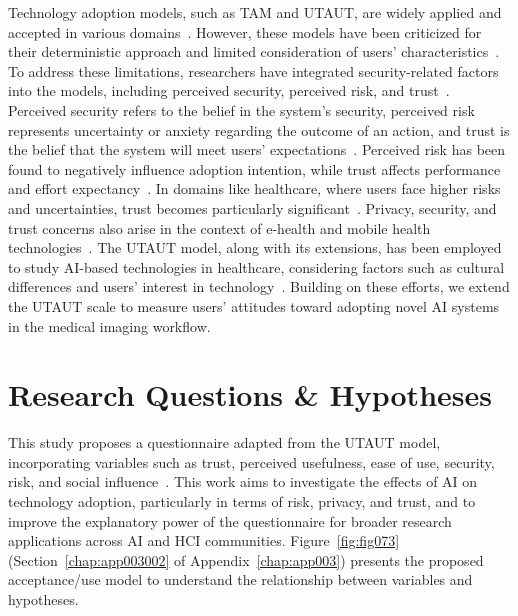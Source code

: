 Technology adoption models, such as \ac{TAM} and \ac{UTAUT}, are widely applied and accepted in various domains~\cite{venkatesh2016unified}.
However, these models have been criticized for their deterministic approach and limited consideration of users' characteristics~\cite{https://doi.org/10.1002/mar.20823}.
To address these limitations, researchers have integrated security-related factors into the models, including perceived security, perceived risk, and trust~\cite{KHALILZADEH2017460, SHIN20091343}.
Perceived security refers to the belief in the system's security, perceived risk represents uncertainty or anxiety regarding the outcome of an action, and trust is the belief that the system will meet users' expectations~\cite{KHALILZADEH2017460, mandrik2005exploring, SHIN20091343}.
Perceived risk has been found to negatively influence adoption intention, while trust affects performance and effort expectancy~\cite{Thakur2014, Lee:2013:0301-2212:587}.
In domains like healthcare, where users face higher risks and uncertainties, trust becomes particularly significant~\cite{LU2011393, ZHOU20131085}.
Privacy, security, and trust concerns also arise in the context of e-health and mobile health technologies~\cite{6038874, Schnall2015, 10.1145/3132272.3134111}.
The \ac{UTAUT} model, along with its extensions, has been employed to study \ac{AI}-based technologies in healthcare, considering factors such as cultural differences and users' interest in technology~\cite{huang2010cultural, SOHN2020101324, info:doi/10.2196/14316}.
Building on these efforts, we extend the \ac{UTAUT} scale to measure users' attitudes toward adopting novel \ac{AI} systems in the medical imaging workflow.

\section{Research Questions \& Hypotheses}
\label{sec:chap004003}

This study proposes a questionnaire adapted from the UTAUT model, incorporating variables such as trust, perceived usefulness, ease of use, security, risk, and social influence~\cite{BOOTSMAN201999, LOOIJE2010386}.
This work aims to investigate the effects of AI on technology adoption, particularly in terms of risk, privacy, and trust, and to improve the explanatory power of the questionnaire for broader research applications across AI and HCI communities.
Figure~\ref{fig:fig073} (Section~\ref{chap:app003002} of Appendix~\ref{chap:app003}) presents the proposed acceptance/use model to understand the relationship between variables and hypotheses.

